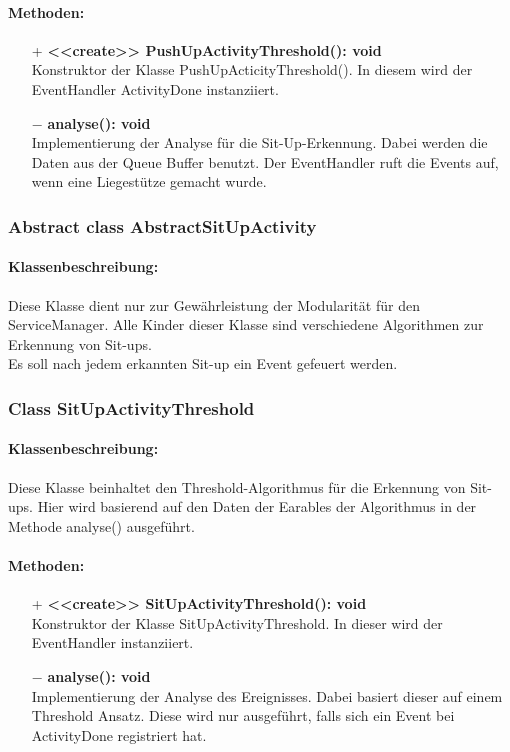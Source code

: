 \documentclass[a4paper,12pt]{article}
\begin{document}
	\paragraph{Methoden:}
	\begin{itemize}
		\item [+]\textbf{<<create>> PushUpActivityThreshold(): void}\\Konstruktor der Klasse PushUpActicityThreshold(). In diesem wird der EventHandler ActivityDone instanziiert. 
		\item [$-$]\textbf{analyse(): void}\\Implementierung der Analyse für die Sit-Up-Erkennung. Dabei werden die Daten aus der Queue Buffer benutzt. Der EventHandler ruft die Events auf, wenn eine Liegestütze gemacht wurde.
	\end{itemize}

	\subsubsection{Abstract class AbstractSitUpActivity}
	\paragraph{Klassenbeschreibung:}
	Diese Klasse dient nur zur Gewährleistung der Modularität für den ServiceManager. Alle Kinder dieser Klasse sind verschiedene Algorithmen zur Erkennung von Sit-ups.\\ Es soll nach jedem erkannten Sit-up ein Event gefeuert werden.
	
	\subsubsection{Class SitUpActivityThreshold}
	\paragraph{Klassenbeschreibung:}
	Diese Klasse beinhaltet den Threshold-Algorithmus für die Erkennung von Sit-ups. Hier wird basierend auf den Daten der Earables der Algorithmus in der Methode analyse() ausgeführt.
	\paragraph{Methoden:}
	\begin{itemize}
		\item [+]\textbf{<<create>> SitUpActivityThreshold(): void}\\Konstruktor der Klasse SitUpActivityThreshold. In dieser wird der EventHandler instanziiert. 
		\item [$-$]\textbf{analyse(): void}\\ Implementierung der Analyse des Ereignisses. Dabei basiert dieser auf einem Threshold Ansatz. Diese wird nur ausgeführt, falls sich ein Event bei ActivityDone registriert hat.
	\end{itemize}
		
\end{document}
